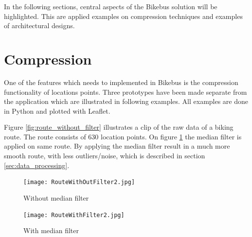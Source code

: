 



In the following sections, central aspects of the Bikebus solution will be highlighted. This are applied examples on compression techniques and examples of architectural designs. 




\section{Compression}
One of the features which needs to implemented in Bikebus is the compression functionality of locations points. Three prototypes have been made separate from the application which are illustrated in following examples. All examples are done in Python and plotted with Leaflet.  

Figure \ref{fig:route_without_filter} illustrates a clip of the raw data of a biking route. The route consists of 630 location points. On figure \ref{fig:route_with_filter} the median filter is applied on same route. By applying the median filter result in a much more smooth route, with less outliers/noise, which is described in section \ref{sec:data_processing}. 
\begin{figure}[H]
\centering
\begin{minipage}{0.50\textwidth}
\centering
    \texttt{[image: RouteWithOutFilter2.jpg]}
    \caption{Without median filter}
    \label{fig:route_without_filter}
\end{minipage}\hfill
\begin{minipage}{0.50\textwidth}
\centering
    \texttt{[image: RouteWithFilter2.jpg]}
    \caption{With median filter}
    \label{fig:route_with_filter}
\end{minipage}
\end{figure}

